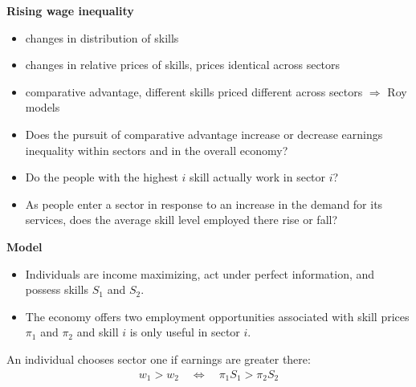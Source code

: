 \begin{frame}
	\textbf{Rising wage inequality}\medskip

	\begin{itemize}\setlength\itemsep{1em}
		\item changes in distribution of skills
		\item changes in relative prices of skills, prices identical across sectors
		\item comparative advantage, different skills priced different across sectors $\Longrightarrow$ Roy models
	\end{itemize}
\end{frame}

\begin{frame}
	\begin{itemize}\setlength\itemsep{1em}
		\item Does the pursuit of comparative advantage increase or decrease earnings inequality within sectors and in the overall economy?
		\item Do the people with the highest $i$ skill actually work in sector $i$?
		\item As people enter a sector in response to an increase in the demand for its services, does the average skill level employed there rise or fall?
	\end{itemize}
\end{frame}
\begin{frame}
	\textbf{ Model}\medskip
	\begin{itemize}\setlength\itemsep{1em}
		\item Individuals are income maximizing, act under perfect information, and possess skills $S_1$ and $S_2$.
		\item The economy offers two employment opportunities associated with skill prices $\pi_1$ and $\pi_2$ and skill $i$ is only useful in sector $i$.
	\end{itemize}\medskip
	An individual chooses sector one if earnings are greater there:
	\begin{align*}
	w_1 > w_2 \quad\Longleftrightarrow\quad \pi_1 S_1 > \pi_2 S_2
	\end{align*}
\end{frame}

\begin{frame}
\begin{figure}[htp]\centering
{}
\end{figure}
\end{frame}

